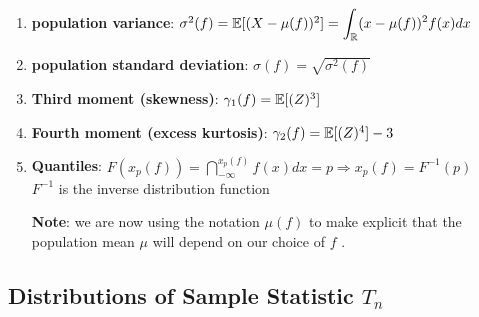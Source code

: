 \begin{enumerate}
\begin{enumerate}
        \item \textbf{population variance}:
        $
            \sigma ^2 ( f )
            = \mathbb{E} [(X - \mu ( f ))^2]
            = \displaystyle\int _{\mathbb{R}} (x - \mu ( f ))^2 f (x) dx
        $
        \hfill \cite{statistics/book/Statistics-for-Data-Scientists/Maurits-Kaptein}

        \item \textbf{population standard deviation}:
        $
            \sigma ( f )
            = \sqrt{\sigma ^2 ( f ) }
        $
        \hfill \cite{statistics/book/Statistics-for-Data-Scientists/Maurits-Kaptein}

        \item \textbf{Third moment (skewness)}:
        $
            \gamma_1( f ) = \mathbb{E} [(Z )^3]
        $
        \hfill \cite{statistics/book/Statistics-for-Data-Scientists/Maurits-Kaptein}

        \item \textbf{Fourth moment (excess kurtosis)}:
        $
            \gamma_2( f ) = \mathbb{E} [(Z )^4]-3
        $
        \hfill \cite{statistics/book/Statistics-for-Data-Scientists/Maurits-Kaptein}

        \item \textbf{Quantiles}:
        $
            F (x _p ( f )) = \dint ^{x _p ( f )} _{-\infty} f (x) dx = p
            \Rightarrow
            x _p ( f ) = F^{-1} ( p)
        $
        \hfill \cite{statistics/book/Statistics-for-Data-Scientists/Maurits-Kaptein}
        \\
        $F^{-1}$ is the inverse distribution function
        \hfill \cite{statistics/book/Statistics-for-Data-Scientists/Maurits-Kaptein}

        \item [\textbf{Note}:] we are now using the notation $\mu ( f )$ to make explicit that the population mean $\mu$ will depend on our choice of $f$ .
        \hfill \cite{statistics/book/Statistics-for-Data-Scientists/Maurits-Kaptein}
    \end{enumerate}
\end{enumerate}





\subsection{Distributions of Sample Statistic $T_n$}


